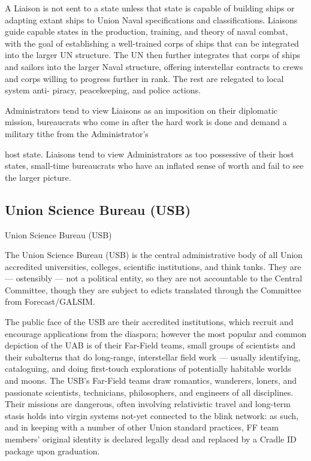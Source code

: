A Liaison is not sent to a state unless that state is capable of building ships or adapting extant
ships to Union Naval specifications and classifications. Liaisons guide capable states in the
production, training, and theory of naval combat, with the goal of establishing a well-trained
corps of ships that can be integrated into the larger UN structure. The UN then further integrates
that corps of ships and sailors into the larger Naval structure, offering interstellar contracts to
crews and corps willing to progress further in rank. The rest are relegated to local system anti-
piracy, peacekeeping, and police actions.


Administrators tend to view Liaisons as an imposition on their diplomatic mission, bureaucrats
who come in after the hard work is done and demand a military tithe from the Administrator’s




host state. Liaisons tend to view Administrators as too possessive of their host states, small-time
bureaucrats who have an inflated sense of worth and fail to see the larger picture.


\subsection{Union Science Bureau (USB)}

Union Science Bureau (USB)

The Union Science Bureau (USB) is the central administrative body of all Union accredited
universities, colleges, scientific institutions, and think tanks. They are — ostensibly — not a
political entity, so they are not accountable to the Central Committee, though they are subject to
edicts translated through the Committee from Forecast/GALSIM.


The public face of the USB are their accredited institutions, which recruit and encourage
applications from the diaspora; however the most popular and common depiction of the UAB is
of their Far-Field teams, small groups of scientists and their subalterns that do long-range,
interstellar field work — usually identifying, cataloguing, and doing first-touch explorations of
potentially habitable worlds and moons. The USB’s Far-Field teams draw romantics, wanderers,
loners, and passionate scientists, technicians, philosophers, and engineers of all disciplines.
Their missions are dangerous, often involving relativistic travel and long-term stasis holds into
virgin systems not-yet connected to the blink network: as such, and in keeping with a number of
other Union standard practices, FF team members’ original identity is declared legally dead and
replaced by a Cradle ID package upon graduation.


